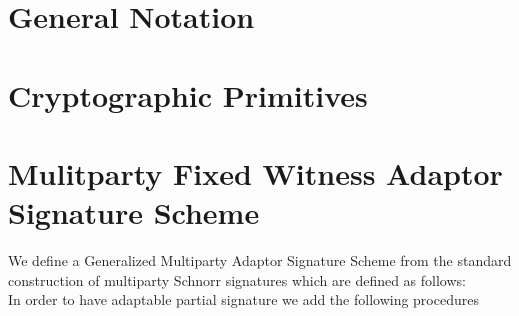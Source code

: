 \section{General Notation}\label{secGenNot}
\section{Cryptographic Primitives}\label{secCrypPrim}
\section{Mulitparty Fixed Witness Adaptor Signature Scheme} \label{secScheme}

We define a Generalized Multiparty Adaptor Signature Scheme from the standard construction of multiparty Schnorr signatures which
are defined as follows:\\

\fbox{
    \parbox{\textwidth}{
        \procedure[linenumbering, syntaxhighlight=auto]{\procGen} {
            \varKey \sample \cnstZq \\
            \varRand \sample \cnstZq \\
            \pcreturn (\varKey \opSeperate \varRand)
        }
        \procedure[linenumbering, syntaxhighlight=auto]{\procGenPartSig} {
            \varSchnorrChallenge \opAssign \funH{(\varMsg \opConc \varGk \opAdd \varGkSt \opConc \varGr \opAdd \varGrSt)} \\
            \varSigPart \opAssign \varKey \opAdd \varSchnorrChallenge \opAdd \varRand \\
            \pcreturn (\varSigPart \opSeperate \varGk \opSeperate \varGr)
        }\\
        \procedure[linenumbering, syntaxhighlight=auto]{\procVerfPartSig} {
            \varSchnorrChallenge \opAssign \funH{((\varMsg \opConc \varGk \opAdd \varGkSt \opConc \varGr \opAdd \varGrSt)} \\
            \pcreturn \varGSigPart \opEq \varGkSt \opAdd \funGen{\varSchnorrChallenge \opMult \varRand}
        }\\
        \procedure[linenumbering, syntaxhighlight=auto]{\procFinSig} {
            \pcreturn (\varSigPart \opAdd \varSigPartSt \opSeperate \varGk \opAdd \varGkSt \opSeperate \varGr \opAdd \varGrSt)
        }
    }
}
In order to have adaptable partial signature we add the following procedures\\

